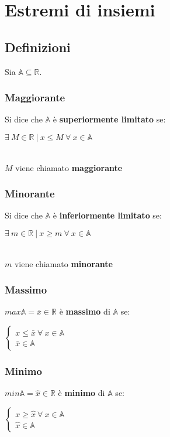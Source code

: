\chapter{Estremi di insiemi}
\label{sec: estremiInsiemi}
\section{Definizioni}
Sia $\mathbb{A} \subseteq \mathbb{R}$.
\subsection{Maggiorante}
Si dice che $\mathbb{A}$ è \textbf{superiormente limitato} se:\\
\begin{Large}
$\exists\ M \in \mathbb{R}\ |\ x \leq M\ \forall\ x \in \mathbb{A}$
\end{Large}\\
$M$ viene chiamato \textbf{maggiorante}
\subsection{Minorante}
Si dice che $\mathbb{A}$ è \textbf{inferiormente limitato} se:\\
\begin{Large}
$\exists\ m \in \mathbb{R}\ |\ x \geq m\ \forall\ x \in \mathbb{A}$
\end{Large}\\
$m$ viene chiamato \textbf{minorante}
\subsection{Massimo}
$max\mathbb{A}=\bar{x} \in \mathbb{R}$ è \textbf{massimo} di $\mathbb{A}$ se:\\
\begin{Large}
$\begin{cases}
x \leq \bar{x}\ \forall\ x \in \mathbb{A}\\
\bar{x} \in \mathbb{A}
\end{cases}$
\end{Large}
\subsection{Minimo}
$min\mathbb{A}=\hat{x} \in \mathbb{R}$ è \textbf{minimo} di $\mathbb{A}$ se:\\
\begin{Large}
$\begin{cases}
x \geq \hat{x}\ \forall\ x \in \mathbb{A}\\
\hat{x} \in \mathbb{A}
\end{cases}$
\end{Large}
